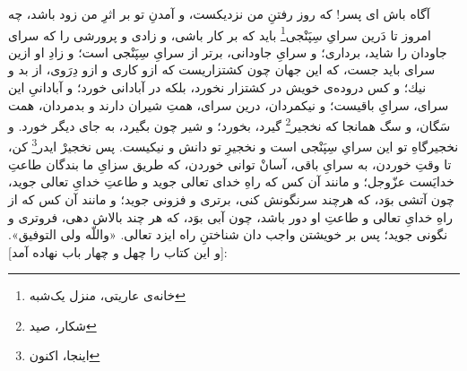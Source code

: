 آگاه باش اى پسر! كه روز رفتنِ من نزديكست، و آمدنِ تو بر اثرِ من زود باشد، چه امروز تا دَرين سراىِ ‌سِپَنْجى\footnote{خانه‌ی عاریتی، منزل یک‌شبه} بايد كه بر كار باشى، و زادى و پرورشى را كه سراى جاودان را شايد، بردارى؛ و سراىِ جاودانى، برتر از سراىِ سِپَنْجى است؛ و زادِ او ازين سراى بايد جست، كه اين جهان چون كشتزاريست كه ازو كارى و ازو دِرَوى، از بد و نيك؛ و كس دروده‌ی خويش در كشتزار نخورد، بلكه در آبادانى خورد؛ و آبادانیِ اين سراى، سراىِ باقيست؛ و نيكمردان، درين سراى، همتِ شيران دارند و بدمردان، همت سَگان، و سگ همانجا كه نخجير\footnote{شکار، صید} گيرد، بخورد؛ و شير چون بگيرد، به جاى ديگر خورد. و نخجيرگاهِ تو اين سراىِ سِپَنْجى است و نخجيرِ تو دانش و نيكيست. پس نخجيرْ ايدر\footnote{اینجا، اکنون}
 كن، تا وقتِ خوردن، به سراىِ باقى، آسانْ توانى خوردن، كه طريق سزاىِ ما بندگان طاعتِ خدايَست عزّوجل؛ و مانند آن كس كه راهِ خداى تعالى جويد و طاعتِ خداىِ تعالى جويد، چون آتشى بوَد، كه هرچند سرنگونش كنى، برترى و فزونى جويد؛ و مانند آن كس كه از راهِ خداىِ تعالى و طاعتِ او دور باشد، چون آبى بوَد، كه هر چند بالاش دهى، فروترى و نگونى جويد؛ پس بر خويشتن واجب دان شناختنِ راه ايزد تعالى. «واللّه ولى التوفيق». [و اين كتاب را چهل ‌و‌ چهار باب نهاده آمد]:

\newpage